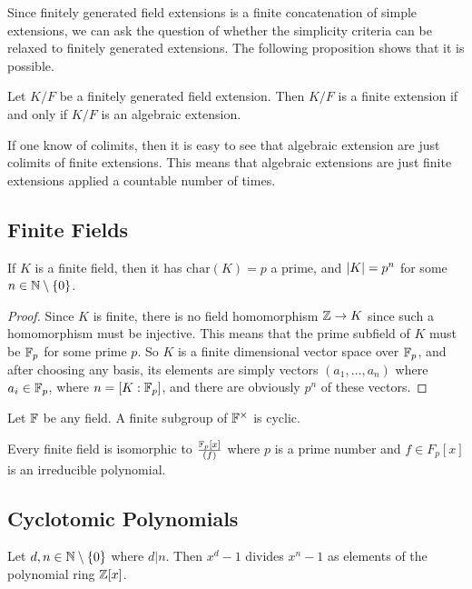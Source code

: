 \documentclass[a4paper]{article}
\begin{document}
Since finitely generated field extensions is a finite concatenation of simple extensions, we can ask the question of whether the simplicity criteria can be relaxed to finitely generated extensions. The following proposition shows that it is possible. 

\begin{prp}{}{} Let $K/F$ be a finitely generated field extension. Then $K/F$ is a finite extension if and only if $K/F$ is an algebraic extension. 
\end{prp}

If one know of colimits, then it is easy to see that algebraic extension are just colimits of finite extensions. This means that algebraic extensions are just finite extensions applied a countable number of times. 

\subsection{Finite Fields}
\begin{prp}{}{} If $K$ is a finite field, then it has $\text{char}(K)=p$ a prime, and $\abs{K}=p^n$ for some $n\in\mathbb{N}\setminus\{0\}$. \tcbline
\begin{proof}
Since $K$ is finite, there is no field homomorphism $\mathbb{Z}\to K$ since such a homomorphism must be injective. This means that the prime subfield of $K$ must be $\mathbb{F}_p$ for some prime $p$. So $K$ is a finite dimensional vector space over $\mathbb{F}_p$, and after choosing any basis, its elements are simply vectors $(a_1,\dots,a_n)$ where $a_i\in\mathbb{F}_p$, where $n=[K:\mathbb{F}_p]$, and there are obviously $p^n$ of these vectors. 
\end{proof}
\end{prp}

\begin{lmm}{}{} Let $\mathbb{F}$ be any field. A finite subgroup of $\mathbb{F}^\times$ is cyclic. 
\end{lmm}

\begin{prp}{}{} Every finite field is isomorphic to $\frac{\mathbb{F}_p[x]}{(f)}$ where $p$ is a prime number and $f\in F_p[x]$ is an irreducible polynomial. 
\end{prp}

\subsection{Cyclotomic Polynomials}
\begin{lmm}{}{} Let $d,n\in\mathbb{N}\setminus\{0\}$ where $d|n$. Then $x^d-1$ divides $x^n-1$ as elements of the polynomial ring $\mathbb{Z}[x]$. 
\end{lmm}
\end{document}
